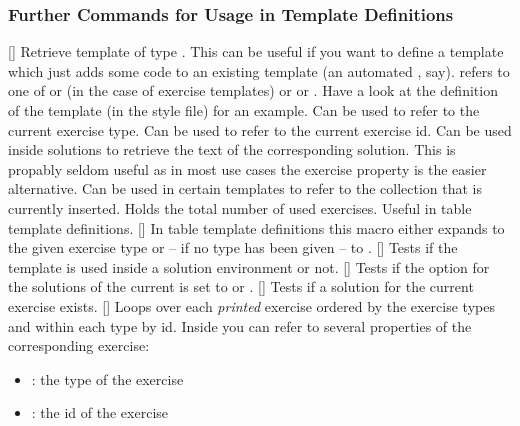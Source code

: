 \documentclass{xsim-manual}
\begin{document}
\subsubsection{Further Commands for Usage in Template Definitions}
\begin{commands}
  []
    Retrieve template  of type .  This can be useful if
    you want to define a template which just adds some code to an existing
    template (an automated , say).  refers to one of
     or  (in the case of exercise templates) or
     or .  Have a look at the definition of the
     template (in the  style file) for an
    example.
  \expandable{}
    Can be used to refer to the current exercise type.
  \expandable{}
    Can be used to refer to the current exercise id.
  \expandable{}
    Can be used inside solutions to retrieve the text of the corresponding
    solution.  This is propably seldom useful as in most use cases the
    exercise property  is the easier alternative.
  \expandable{}
    Can be used in certain templates to refer to the collection that is
    currently inserted.
  \expandable{}
    Holds the total number of used exercises.  Useful in table template
    definitions.
  \expandable{}[]
    In table template definitions this macro either expands to the given
    exercise type or -- if no type has been given -- to .
  \expandable{}[]
    Tests if the template is used inside a solution environment or not.
  \expandable{}[]
    Tests if the option  for the solutions of the current
     is set to  or .
  []
    Tests if a solution for the current exercise exists.
  []
    Loops over each \emph{printed} exercise ordered by the exercise types and
    within each type by id.  Inside  you can refer to several
    properties of the corresponding exercise:
    \begin{itemize}
      \item {}: the type of the exercise
      \item {}: the id of the exercise

\end{itemize}
\end{commands}
\end{document}
